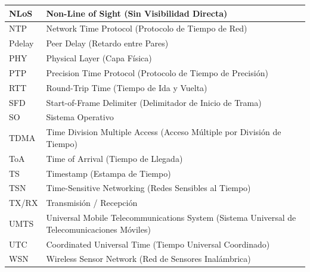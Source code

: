 {\begin{tabular}{|l|p{}|}
  NLoS & Non-Line of Sight (Sin Visibilidad Directa) \\
  \hline
  NTP & Network Time Protocol (Protocolo de Tiempo de Red) \\
  \hline
  Pdelay & Peer Delay (Retardo entre Pares) \\
  \hline
  PHY & Physical Layer (Capa Física) \\
  \hline
  PTP & Precision Time Protocol (Protocolo de Tiempo de Precisión) \\
  \hline
  RTT & Round-Trip Time (Tiempo de Ida y Vuelta) \\
  \hline
  SFD & Start-of-Frame Delimiter (Delimitador de Inicio de Trama) \\
  \hline
  SO & Sistema Operativo \\
  \hline
  TDMA & Time Division Multiple Access (Acceso Múltiple por División de Tiempo) \\
  \hline
  ToA & Time of Arrival (Tiempo de Llegada) \\
  \hline
  TS & Timestamp (Estampa de Tiempo) \\
  \hline
  TSN & Time-Sensitive Networking (Redes Sensibles al Tiempo) \\
  \hline
  TX/RX & Transmisión / Recepción \\
  \hline
  UMTS & Universal Mobile Telecommunications System (Sistema Universal de Telecomunicaciones Móviles) \\
  \hline
  UTC & Coordinated Universal Time (Tiempo Universal Coordinado) \\
  \hline
  WSN & Wireless Sensor Network (Red de Sensores Inalámbrica) \\
  \hline
\end{tabular}}

